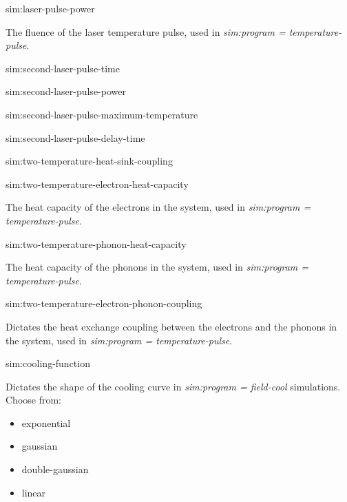 {\zicf sim:laser-pulse-power} The fluence of the laser temperature pulse, used in \textit{sim:program = temperature-pulse}.

{\zicf sim:second-laser-pulse-time}

{\zicf sim:second-laser-pulse-power}

{\zicf sim:second-laser-pulse-maximum-temperature}

{\zicf sim:second-laser-pulse-delay-time}

{\zicf sim:two-temperature-heat-sink-coupling}

{\zicf sim:two-temperature-electron-heat-capacity} The heat capacity of the electrons in the system, used in \textit{sim:program = temperature-pulse}.

{\zicf sim:two-temperature-phonon-heat-capacity} The heat capacity of the phonons in the system, used in \textit{sim:program = temperature-pulse}.

{\zicf sim:two-temperature-electron-phonon-coupling}
Dictates the heat exchange coupling between the electrons and the phonons in the system, used in \newline\textit{sim:program = temperature-pulse}.

{\zicf sim:cooling-function} Dictates the shape of the cooling curve in \textit{sim:program = field-cool} simulations. Choose from:

\begin{itemize}
    \item[] exponential
    \item[] gaussian
    \item[] double-gaussian
    \item[] linear
\end{itemize}

